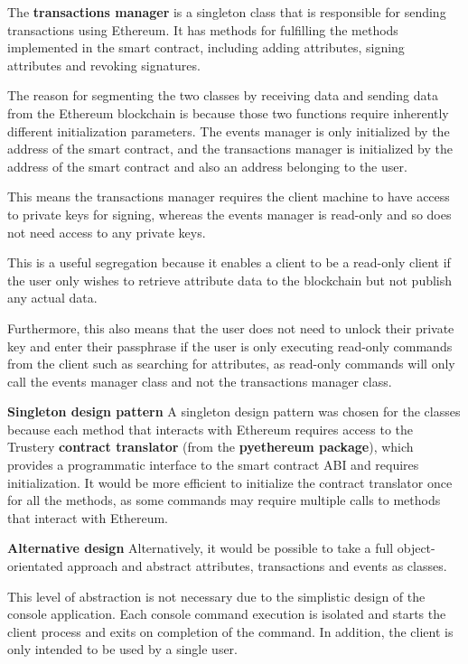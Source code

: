 \documentclass[12pt,a4paper]{report}
\begin{document}
	The \textbf{transactions manager} is a singleton class that is responsible for sending transactions using Ethereum. It has methods for fulfilling the methods implemented in the smart contract, including adding attributes, signing attributes and revoking signatures.
	
	The reason for segmenting the two classes by receiving data and sending data from the Ethereum blockchain is because those two functions require inherently different initialization parameters. The events manager is only initialized by the address of the smart contract, and the transactions manager is initialized by the address of the smart contract and also an address belonging to the user.
	
	This means the transactions manager requires the client machine to have access to private keys for signing, whereas the events manager is read-only and so does not need access to any private keys.
	
	This is a useful segregation because it enables a client to be a read-only client if the user only wishes to retrieve attribute data to the blockchain but not publish any actual data.
	
	Furthermore, this also means that the user does not need to unlock their private key and enter their passphrase if the user is only executing read-only commands from the client such as searching for attributes, as read-only commands will only call the events manager class and not the transactions manager class.
	
	\bigskip
	\noindent \textbf{Singleton design pattern}\newline
	A singleton design pattern was chosen for the classes because each method that interacts with Ethereum requires access to the Trustery \textbf{contract translator} (from the \textbf{pyethereum package}), which provides a programmatic interface to the smart contract ABI and requires initialization. It would be more efficient to initialize the contract translator once for all the methods, as some commands may require multiple calls to methods that interact with Ethereum.
	
	\bigskip
	\noindent \textbf{Alternative design}\newline
	Alternatively, it would be possible to take a full object-orientated approach and abstract attributes, transactions and events as classes.
	
	This level of abstraction is not necessary due to the simplistic design of the console application. Each console command execution is isolated and starts the client process and exits on completion of the command. In addition, the client is only intended to be used by a single user.
	
\end{document}
